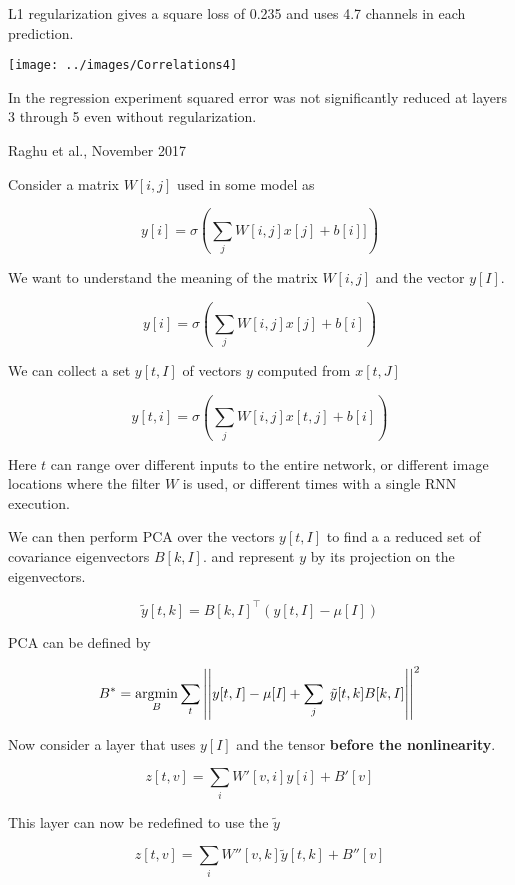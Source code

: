 {\vfill
L1 regularization gives a {\color{red} square loss of 0.235} and uses {\color{red} 4.7 channels} in each prediction.


\centerline{\texttt{[image: ../images/Correlations4]}}

\vfill
In the regression experiment squared error was not significantly reduced at layers 3 through 5 even without regularization. 

{Raghu et al., November 2017}

Consider a matrix $W[i,j]$ used in some model as

\vfill
$$y[i] = \sigma\left(\sum_j W[i,j] x[j] + b[i]]\right)$$

\vfill
We want to understand the meaning of the matrix $W[i,j]$ and the vector $y[I]$.


$$y[i] = \sigma\left(\sum_j W[i,j] x[j] + b[i]\right)$$

\vfill
We can collect a set $y[t,I]$  of vectors $y$ computed from $x[t,J]$

\vfill
$$y[t,i] = \sigma\left(\sum_j W[i,j] x[t,j] + b[i]\right)$$

Here $t$ can range over different inputs to the entire network, or different image locations where the filter $W$ is used,
or different times with a single RNN execution.


\vfill
We can then perform PCA over the vectors $y[t,I]$ to find a a reduced set of covariance eigenvectors $B[k,I]$.
and represent $y$ by its projection on the eigenvectors.

$$\tilde{y}[t,k] = B[k,I]^\top (y[t,I] - \mu[I])$$

\vfill
PCA can be defined by

\vfill
$$B^* = \operatorname*{argmin}_B \sum_t \left|\left|y[t,I] - \mu[I] + \sum_j \;\tilde{y}[t,k]B[k,I]\right|\right|^2$$


Now consider a layer that uses $y[I]$ and the tensor {\bf before the nonlinearity}.

\vfill
$$z[t,v] = \sum_i W'[v,i]y[i] + B'[v]$$

\vfill
This layer can now be redefined to use the $\tilde{y}$

\vfill
$$z[t,v] = \sum_i W''[v,k]\tilde{y}[t,k] + B''[v]$$

}
